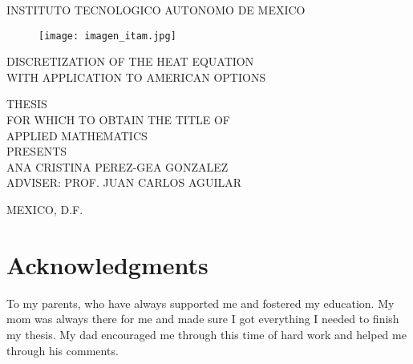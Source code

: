 \documentclass[11pt,letterpaper]{book}
\theoremstyle{definition}
\begin{document}
\newpage
\thispagestyle{empty}
\begin{center}
\Large

INSTITUTO TECNOLOGICO AUTONOMO DE MEXICO\\

\begin{figure}[H]
\centering
\texttt{[image: imagen\_itam.jpg]}
\end{figure}

\vspace{1cm}

DISCRETIZATION OF THE HEAT EQUATION \\
WITH APPLICATION TO AMERICAN OPTIONS\\

\vspace{1cm}

THESIS\\
FOR WHICH TO OBTAIN THE TITLE OF\\ %
APPLIED MATHEMATICS\\
PRESENTS\\

\vspace{1cm}
ANA CRISTINA PEREZ-GEA GONZALEZ\\

\vspace{1cm}
ADVISER: PROF. JUAN CARLOS AGUILAR\\

\vfill
\begin{minipage}{.45\textwidth}
\flushleft
MEXICO, D.F.
\end{minipage} \begin{minipage}{.45\textwidth}
\end{minipage}


\end{center}


\newpage
\thispagestyle{empty}
\mbox{}







\chapter*{Acknowledgments}



To my parents, who have always supported me and fostered my education. My mom was always there for me and made sure I got everything I needed to finish my thesis. My dad encouraged me through this time of hard work and helped me through his comments.
\end{document}
